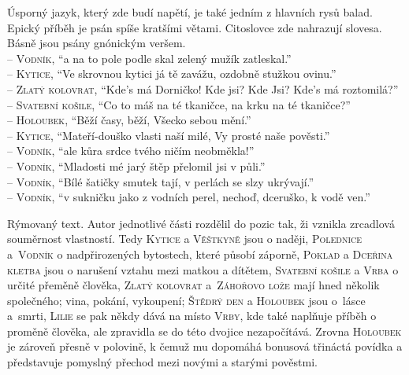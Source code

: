\documentclass{extarticle} %
\begin{document}
\noindent
Úsporný jazyk, který zde budí napětí, je také jedním z hlavních rysů balad. Epický příběh je psán spíše kratšími větami. Citoslovce zde nahrazují slovesa. Básně jsou psány gnónickým veršem. \\
{\small
{} -- \textsc{Vodník}, \enquote{a na to pole podle skal zelený mužík zatleskal.} \\
 -- \textsc{Kytice}, \enquote{Ve skrovnou kytici já tě zavážu, ozdobně stužkou ovinu.} \\
 -- \textsc{Zlatý kolovrat}, \enquote{Kde's má Dorničko! Kde jsi? Kde Jsi?
Kde's má roztomilá?}\\
 -- \textsc{Svatební košile}, \enquote{Co to máš na té tkaničce,
na krku na té tkaničce?}\\
 -- \textsc{Holoubek}, \enquote{Běží časy, běží,
Všecko sebou mění.}\\
 -- \textsc{Kytice}, \enquote{Mateří-douško vlasti naší milé,
Vy prosté naše pověsti.}\\
 -- \textsc{Vodník}, \enquote{ale kůra srdce tvého
ničím neobměkla!}\\
 -- \textsc{Vodník}, \enquote{Mladosti mé jarý štěp
přelomil jsi v půli.}\\
 -- \textsc{Vodník}, \enquote{Bílé šatičky smutek tají,
v perlách se slzy ukrývají.}\\
 -- \textsc{Vodník}, \enquote{v sukničku jako z vodních perel,
nechoď, dceruško, k vodě ven.}\\
}

\vspace{-1em}
\noindent 
Rýmovaný text. Autor jednotlivé části rozdělil do pozic tak, ži vznikla zrcadlová souměrnost vlastností. Tedy \textsc{Kytice} a \textsc{Věštkyně} jsou o naději, \textsc{Polednice} a~\textsc{Vodník} o nadpřirozených bytostech, které působí záporně, \textsc{Poklad} a \textsc{Dceřina kletba} jsou o narušení vztahu mezi matkou a dítětem, \textsc{Svatební košile} a \textsc{Vrba} o určité přeměně člověka, \textsc{Zlatý kolovrat} a~\textsc{Záhořovo lože} mají hned několik společného; vina, pokání, vykoupení; \textsc{Štědrý den} a \textsc{Holoubek} jsou o~lásce a~smrti, \textsc{Lilie} se pak někdy dává na místo \textsc{Vrby}, kde také naplňuje příběh o proměně člověka, ale zpravidla se do této dvojice nezapočítává. Zrovna \textsc{Holoubek} je zároveň přesně v polovině, k čemuž mu dopomáhá bonusová třináctá povídka a představuje pomyslný přechod mezi novými a starými pověstmi.
\end{document}
